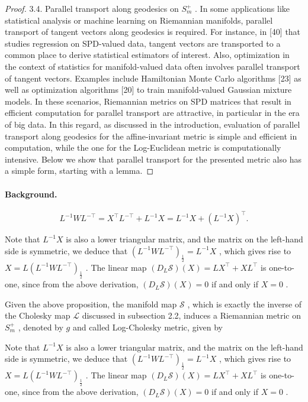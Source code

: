 \documentclass[11pt]{article}
\begin{document}
\begin{proof}
3.4. Parallel transport along geodesics on  $S_{m}^{+}$ . In some applications like statistical analysis or machine learning on Riemannian manifolds, parallel transport of tangent vectors along geodesics is required. For instance, in [40] that studies regression on SPD-valued data, tangent vectors are transported to a common place to derive statistical estimators of interest. Also, optimization in the context of statistics for manifold-valued data often involves parallel transport of tangent vectors. Examples include Hamiltonian Monte Carlo algorithms [23] as well as optimization algorithms [20] to train manifold-valued Gaussian mixture models. In these scenarios, Riemannian metrics on SPD matrices that result in efficient computation for parallel transport are attractive, in particular in the era of big data. In this regard, as discussed in the introduction, evaluation of parallel transport along geodesics for the affine-invariant metric is simple and efficient in computation, while the one for the Log-Euclidean metric is computationally intensive. Below we show that parallel transport for the presented metric also has a simple form, starting with a lemma.

\end{proof}

\paragraph{Background.}
$$
L ^ {- 1} W L ^ {- \top} = X ^ {\top} L ^ {- \top} + L ^ {- 1} X = L ^ {- 1} X + (L ^ {- 1} X) ^ {\top}.
$$

Note that  $L^{-1}X$  is also a lower triangular matrix, and the matrix on the left-hand side is symmetric, we deduce that  $(L^{-1}WL^{-\top})_{\frac{1}{2}} = L^{-1}X$ , which gives rise to  $X = L(L^{-1}WL^{-\top})_{\frac{1}{2}}$ . The linear map  $(D_L\mathcal{S})(X) = LX^\top +XL^\top$  is one-to-one, since from the above derivation,  $(D_L\mathcal{S})(X) = 0$  if and only if  $X = 0$ .

Given the above proposition, the manifold map  $\mathcal{S}$ , which is exactly the inverse of the Cholesky map  $\mathcal{L}$  discussed in subsection 2.2, induces a Riemannian metric on  $S_{m}^{+}$ , denoted by  $g$  and called Log-Cholesky metric, given by

Note that  $L^{-1}X$  is also a lower triangular matrix, and the matrix on the left-hand side is symmetric, we deduce that  $(L^{-1}WL^{-\top})_{\frac{1}{2}} = L^{-1}X$ , which gives rise to  $X = L(L^{-1}WL^{-\top})_{\frac{1}{2}}$ . The linear map  $(D_L\mathcal{S})(X) = LX^\top +XL^\top$  is one-to-one, since from the above derivation,  $(D_L\mathcal{S})(X) = 0$  if and only if  $X = 0$ .
\end{document}
